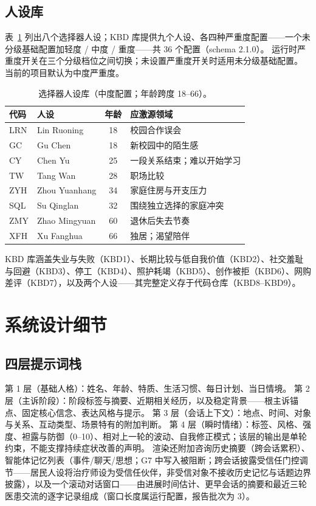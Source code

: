\documentclass[11pt,a4paper]{article}
\begin{document}
\subsection{人设库}

表~\ref{tab:personas} 列出八个选择器人设；KBD 库提供九个人设、各四种严重度配置——一个未分级基础配置加轻度 / 中度 / 重度——共 36 个配置（schema 2.1.0）。
运行时严重度开关在三个分级档位之间切换；未设置严重度开关时适用未分级基础配置。
当前的项目默认为中度严重度。

\begin{table}[h]
\centering
\caption{选择器人设库（中度配置；年龄跨度 18--66）。}
\label{tab:personas}
\small
\begin{tabular}{@{}llcl@{}}
\toprule
代码 & 人设 & 年龄 & 应激源领域 \\
\midrule
LRN & Lin Ruoning & 18 & 校园合作误会 \\
GC  & Gu Chen & 18 & 新校园中的陌生感 \\
CY  & Chen Yu & 25 & 一段关系结束；难以开始学习 \\
TW  & Tang Wan & 28 & 职场比较 \\
ZYH & Zhou Yuanhang & 34 & 家庭住房与开支压力 \\
SQL & Su Qinglan & 32 & 围绕独立选择的家庭冲突 \\
ZMY & Zhao Mingyuan & 60 & 退休后失去节奏 \\
XFH & Xu Fanghua & 66 & 独居；渴望陪伴 \\
\bottomrule
\end{tabular}
\end{table}

KBD 库涵盖失业与失败（KBD1）、长期比较与低自我价值（KBD2）、社交羞耻与回避（KBD3）、停工（KBD4）、照护耗竭（KBD5）、创作被拒（KBD6）、网购差评（KBD7），以及两个人设——其完整定义存于代码仓库（KBD8--KBD9）。

\section{系统设计细节}\label{app:details}

\subsection{四层提示词栈}

第 1 层（基础人格）：姓名、年龄、特质、生活习惯、每日计划、当日情境。
第 2 层（主诉阶段）：阶段标签与摘要、近期相关经历，以及稳定背景——根主诉锚点、固定核心信念、表达风格与提示。
第 3 层（会话上下文）：地点、时间、对象与关系、互动类型、场景特有的附加判断。
第 4 层（瞬时情绪）：标签、风格、强度、袒露与防御（0--10）、相对上一轮的波动、自我修正模式；该层的输出是单轮约束，不能支撑持续症状改善的声明。
渲染还附加咨询历史摘要（跨会话累积）、智能体记忆列表（事件/聊天/思想；G7 中写入被阻断；跨会话披露受信任门控调节——居民人设将治疗师设为受信任伙伴，非受信对象不接收历史记忆与话题边界披露），以及一个滚动对话窗口——由进展时间估计、更早会话的摘要和最近三轮医患交流的逐字记录组成（窗口长度属运行配置，报告批次为 3）。
\end{document}

